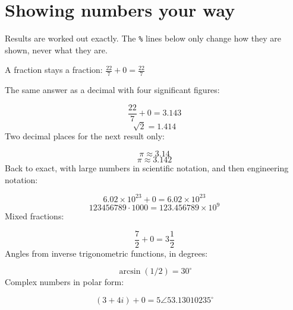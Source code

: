 \documentclass[11pt,a4paper]{article}
\theoremstyle{plain}
\theoremstyle{definition}
\theoremstyle{remark}
\begin{document}
\section*{Showing numbers your way}

Results are worked out exactly. The \texttt{\%} lines below only change how they are shown, never what they are.

A fraction stays a fraction: $\frac{22}{7} + 0 = \frac{22}{7}$

The same answer as a decimal with four significant figures:

\begin{equation*}
  \frac{22}{7} + 0 = 3.143
\end{equation*}
\begin{equation*}
  \sqrt{2} = 1.414
\end{equation*}
Two decimal places for the next result only:

\begin{equation*}
  \pi \approx 3.14
\end{equation*}
\begin{equation*}
  \pi \approx 3.142
\end{equation*}
Back to exact, with large numbers in scientific notation, and then engineering notation:

\begin{equation*}
  6.02 \times 10^{23} + 0 = 6.02 \times 10^{23}
\end{equation*}
\begin{equation*}
  123456789 \cdot 1000 = 123.456789 \times 10^{9}
\end{equation*}
Mixed fractions:

\begin{equation*}
  \frac{7}{2} + 0 = 3\frac{1}{2}
\end{equation*}
Angles from inverse trigonometric functions, in degrees:

\begin{equation*}
  \arcsin(1/2) = 30^\circ
\end{equation*}
Complex numbers in polar form:

\begin{equation*}
  (3 + 4i) + 0 = 5\angle 53.13010235^\circ
\end{equation*}
\end{document}
